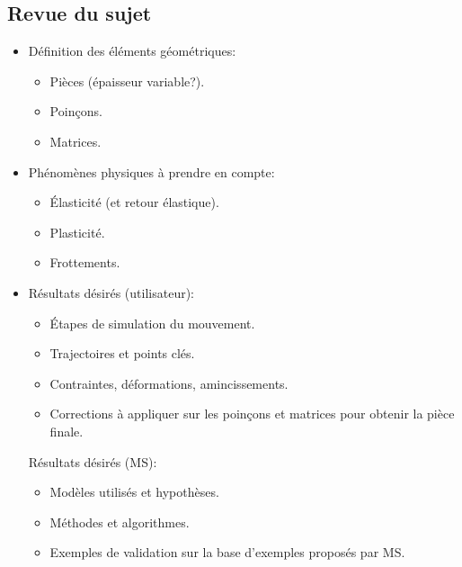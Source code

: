 \subsection{Revue du sujet}
\begin{itemize}
    \item Définition des éléments géométriques:
    \begin{itemize}
        \item Pièces (épaisseur variable?).
        \item Poinçons.
        \item Matrices.
    \end{itemize}
    \item Phénomènes physiques à prendre en compte:
    \begin{itemize}
        \item Élasticité (et retour élastique).
        \item Plasticité.
        \item Frottements.
    \end{itemize}
    \item Résultats désirés (utilisateur):
    \begin{itemize}
        \item Étapes de simulation du mouvement.
        \item Trajectoires et points clés.
        \item Contraintes, déformations, amincissements.
        \item Corrections à appliquer sur les poinçons et matrices pour obtenir la pièce finale.
    \end{itemize}
    Résultats désirés (MS):
    \begin{itemize}
        \item Modèles utilisés et hypothèses.
        \item Méthodes et algorithmes.
        \item Exemples de validation sur la base d'exemples proposés par MS.
    \end{itemize}
\end{itemize}
    
